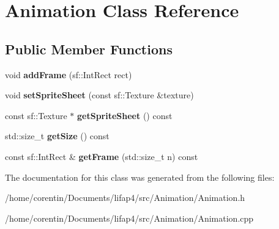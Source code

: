 \hypertarget{class_animation}{}\section{Animation Class Reference}
\label{class_animation}
\subsection*{Public Member Functions}
\begin{DoxyCompactItemize}
\item 
\mbox{\label{class_animation_a486ee5fa2d40ae90f227a19866998c91}} 
void {\bfseries add\+Frame} (sf\+::\+Int\+Rect rect)
\item 
\mbox{\label{class_animation_a2fb16f452a323d51a0104c0aa454cab3}} 
void {\bfseries set\+Sprite\+Sheet} (const sf\+::\+Texture \&texture)
\item 
\mbox{\label{class_animation_abf4f00f8b1657829583d7d92e71b93d1}} 
const sf\+::\+Texture $\ast$ {\bfseries get\+Sprite\+Sheet} () const
\item 
\mbox{\label{class_animation_ac6854dc96e9fc8ffd97feba43547c869}} 
std\+::size\+\_\+t {\bfseries get\+Size} () const
\item 
\mbox{\label{class_animation_a8cf30a3b19ba104eeb34b08f45cfabe2}} 
const sf\+::\+Int\+Rect \& {\bfseries get\+Frame} (std\+::size\+\_\+t n) const
\end{DoxyCompactItemize}


The documentation for this class was generated from the following files\+:\begin{DoxyCompactItemize}
\item 
/home/corentin/\+Documents/lifap4/src/\+Animation/Animation.\+h\item 
/home/corentin/\+Documents/lifap4/src/\+Animation/Animation.\+cpp\end{DoxyCompactItemize}
